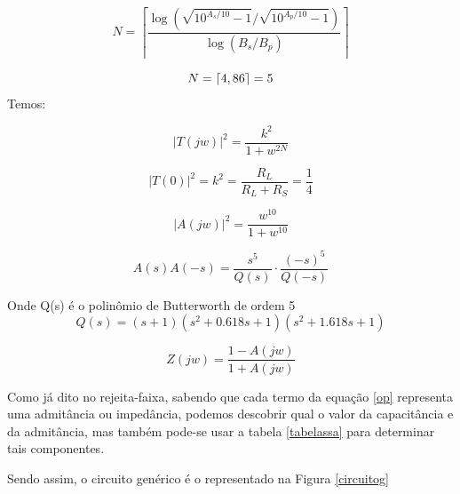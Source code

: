 \documentclass[14pt, oneside]{book}
\DeclarePairedDelimiter{\ceil}{\lceil}{\rceil}
\theoremstyle{definition}
\begin{document}
            \begin{equation}
            \label{ordembf}
            N = \left\lceil{\frac{{\log{(\sqrt{10^{A_s/10}-1}/\sqrt{10^{A_p/10}-1})}}}{{\log{(B_s/B_p)}}}}\right\rceil
            \end{equation}
                
            \begin{equation}
            N = \ceil{4,86} = 5
            \end{equation}
            Temos:
            
            \begin{equation}
            |T(jw)|^2 = \frac{k^2}{1+w^{2N}}
            \end{equation}
            
            \begin{equation}
            |T(0)|^2 = k^2 = \frac{R_L}{R_L+R_S}=\frac{1}{4}
            \end{equation}
            
            \begin{equation}
            |A(jw)|^2 = \frac{w^{10}}{1+w^{10}}
            \end{equation}
            
            \begin{equation}
            A(s)A(-s) = \frac{s^5}{Q(s)}\cdot \frac{(-s)^5}{Q(-s)}
            \end{equation}
            
            Onde Q(s) é o polinômio de Butterworth de ordem 5
            \begin{equation}
            Q(s) = (s+1)(s^2+0.618s+1)(s^2+1.618s+1)
            \end{equation}
            
            \begin{equation}
            Z(jw) = \frac{1- A(jw)}{1+ A(jw)}
            \label{op}
            \end{equation}
            
            
            Como já dito no rejeita-faixa, sabendo que cada termo da equação \ref{op} representa uma admitância ou impedância, podemos descobrir qual o valor da capacitância e da admitância, mas também pode-se usar a tabela \ref{tabelassa} para determinar tais componentes.
        
            
            Sendo assim, o circuito genérico é o representado na Figura \ref{circuitog}
            
\end{document}
